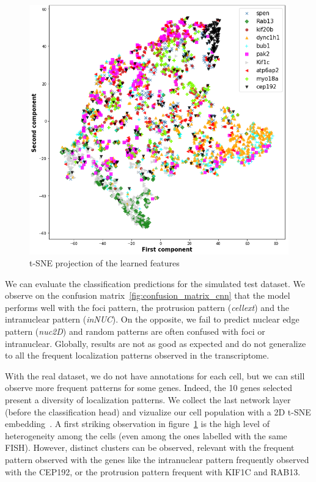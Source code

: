 \begin{figure}[h]
    \centering
    \includegraphics[width=\textwidth]{figures/appendix/tsne_cnn}
    \caption[t-SNE projection of the learned features]{t-SNE projection of the learned features}
    \label{fig:tsne_cnn}
\end{figure}

We can evaluate the classification predictions for the simulated test dataset.
We observe on the confusion matrix~\ref{fig:confusion_matrix_cnn} that the model performs well with the foci pattern, the protrusion pattern (\emph{cellext}) and the intranuclear pattern (\emph{inNUC}).
On the opposite, we fail to predict nuclear edge pattern (\emph{nuc2D}) and random patterns are often confused with foci or intranuclear.
Globally, results are not as good as expected and do not generalize to all the frequent localization patterns observed in the transcriptome.

With the real dataset, we do not have annotations for each cell, but we can still observe more frequent patterns for some genes.
Indeed, the 10 genes selected present a diversity of localization patterns.
We collect the last network layer (before the classification head) and vizualize our cell population with a 2D t-SNE embedding~\cite{vandermaaten_2008,wattenberg2016}.
A first striking observation in figure~\ref{fig:tsne_cnn} is the high level of heterogeneity among the cells (even among the ones labelled with the same \ac{FISH}).
However, distinct clusters can be observed, relevant with the frequent pattern observed with the genes like the intranuclear pattern frequently observed with the CEP192, or the protrusion pattern frequent with KIF1C and RAB13.

